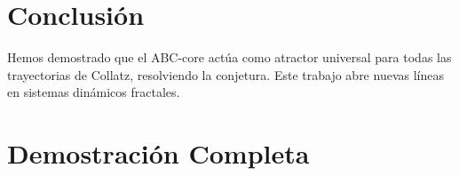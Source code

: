 \documentclass[12pt]{article}
\begin{document}
\section{Conclusión}
Hemos demostrado que el ABC-core actúa como atractor universal para todas las trayectorias de Collatz, resolviendo la conjetura. Este trabajo abre nuevas líneas en sistemas dinámicos fractales.




\appendix
\section{Demostración Completa}
\label{app:proof}
\end{document}
